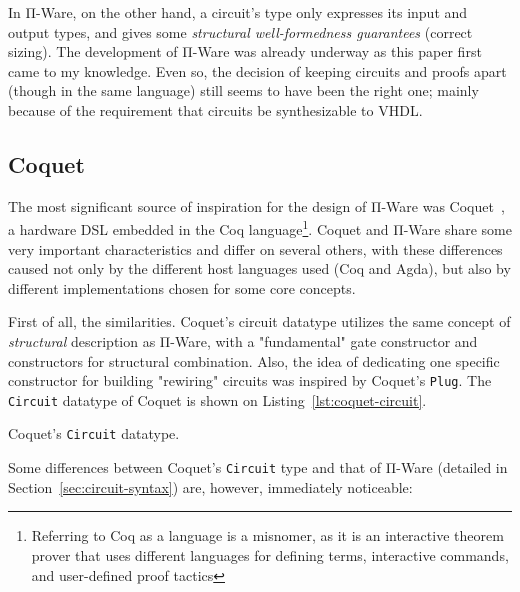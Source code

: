         In Π-Ware, on the other hand, a circuit's type only expresses its input and output types,
        and gives some \emph{structural well-formedness guarantees} (correct sizing).
        The development of Π-Ware was already underway as this paper first came to my knowledge.
        Even so, the decision of keeping circuits and proofs apart (though in the same language)
        still seems to have been the right one; mainly because of the requirement that circuits
        be synthesizable to \ac{VHDL}.

        \subsection{Coquet}
        \label{subsec:coquet}
            The most significant source of inspiration for the design of Π-Ware was
            Coquet~\cite{coquet2011}, a hardware \ac{DSL} embedded in the Coq
            language\footnote{Referring to Coq as a language is a misnomer, as it is
                an interactive theorem prover that uses different languages for defining terms,
                interactive commands, and user-defined proof tactics}.
            Coquet and Π-Ware share some very important characteristics and differ on several others,
            with these differences caused not only by the different host languages used (Coq and Agda),
            but also by different implementations chosen for some core concepts.

            First of all, the similarities.
            Coquet's circuit datatype utilizes the same concept of \emph{structural} description
            as Π-Ware, with a "fundamental" gate constructor and constructors for structural combination.
            Also, the idea of dedicating one specific constructor for building "rewiring" circuits
            was inspired by Coquet's \texttt{Plug}.
            The \texttt{Circuit} datatype of Coquet is shown on Listing~\ref{lst:coquet-circuit}.

            \begin{listing}[h]
                \caption{Coquet's \texttt{Circuit} datatype.\label{lst:coquet-circuit}}
            \end{listing}

            Some differences between Coquet's \texttt{Circuit} type and that of Π-Ware
            (detailed in Section~\ref{sec:circuit-syntax}) are, however, immediately noticeable:

